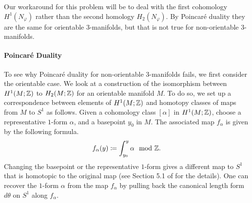 Our workaround for this problem will be to deal with the first cohomology $H^1(N_{\varphi})$ rather than the second homology $H_2(N_{\varphi})$.
By Poincar\'e duality they are the same for orientable 3-manifolds, but that is not true for non-orientable $3$-manifolds.

\paragraph{Poincar\'e Duality}
To see why Poincar\'e duality for non-orientable 3-manifolds fails, we first consider the orientable case. 
We look at a construction of the isomorphism between $H^1(M; \mathbb{Z})$ to $H_2(M; \mathbb{Z})$ for an orientable manifold $M$.  To do so, we set up a correspondence between elements of $H^1(M; \mathbb{Z})$ and homotopy classes of maps from $M$ to $S^1$ as follows.
Given a cohomology class $[\alpha]$ in $H^1(M; \mathbb{Z})$, choose a representative $1$-form $\alpha$, and a basepoint $y_0$ in $M$.
The associated map $f_{\alpha}$ is given by the following formula.
\begin{align}\label{form:map}
  f_{\alpha}(y) \coloneqq  \int_{y_0}^y \alpha \mod {\mathbb{Z}}.
\end{align}
Changing the basepoint or the representative $1$-form gives a different map to $S^1$ that is homotopic to the original map (see Section 5.1 of \cite{calegari2007foliations} for the details).
One can recover the $1$-form $\alpha$ from the map $f_{\alpha}$ by pulling back the canonical length form $d\theta$ on $S^1$ along $f_{\alpha}$.


